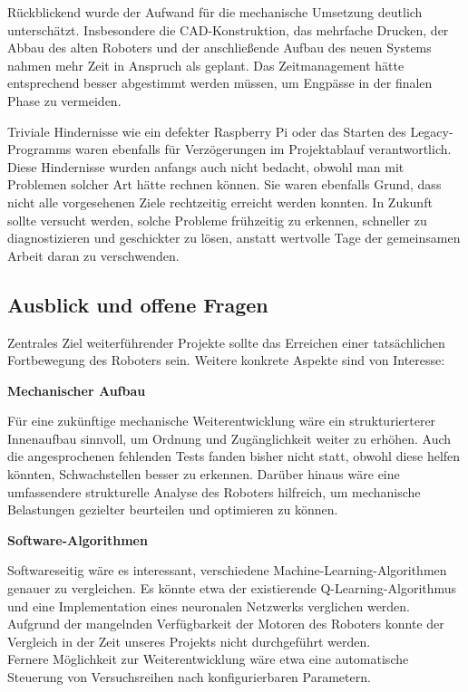 Rückblickend wurde der Aufwand für die mechanische Umsetzung deutlich unterschätzt. Insbesondere die CAD-Konstruktion, das mehrfache Drucken, der Abbau des alten Roboters und der anschließende Aufbau des neuen Systems nahmen mehr Zeit in Anspruch als geplant. Das Zeitmanagement hätte entsprechend besser abgestimmt werden müssen, um Engpässe in der finalen Phase zu vermeiden.

Triviale Hindernisse wie ein defekter Raspberry Pi oder das Starten des Legacy-\hspace{0px}Programms waren ebenfalls für Verzögerungen im Projektablauf verantwortlich. Diese Hindernisse wurden anfangs auch nicht bedacht, obwohl man mit Problemen solcher Art hätte rechnen können. Sie waren ebenfalls Grund, dass nicht alle vorgesehenen Ziele rechtzeitig erreicht werden konnten. In Zukunft sollte versucht werden, solche Probleme frühzeitig zu erkennen, schneller zu diagnostizieren und geschickter zu lösen, anstatt wertvolle Tage der gemeinsamen Arbeit daran zu verschwenden.

\subsection{Ausblick und offene Fragen}

Zentrales Ziel weiterführender Projekte sollte das Erreichen einer tatsächlichen Fortbewegung des Roboters sein. Weitere konkrete Aspekte sind von Interesse:

\textbf{Mechanischer Aufbau}

Für eine zukünftige mechanische Weiterentwicklung wäre ein strukturierterer Innenaufbau sinnvoll, um Ordnung und Zugänglichkeit weiter zu erhöhen. Auch die angesprochenen fehlenden Tests fanden bisher nicht statt, obwohl diese helfen könnten, Schwachstellen besser zu erkennen. Darüber hinaus wäre eine umfassendere strukturelle Analyse des Roboters hilfreich, um mechanische Belastungen gezielter beurteilen und optimieren zu können.

\textbf{Software-Algorithmen}

Softwareseitig wäre es interessant, verschiedene Machine-Learning-Algorithmen genauer zu vergleichen. Es könnte etwa der existierende Q-Learning-Algorithmus und eine Implementation eines neuronalen Netzwerks verglichen werden. Aufgrund der mangelnden Verfügbarkeit der Motoren des Roboters konnte der Vergleich in der Zeit unseres Projekts nicht durchgeführt werden. \\ Fernere Möglichkeit zur Weiterentwicklung wäre etwa eine automatische Steuerung von Versuchsreihen nach konfigurierbaren Parametern. 

